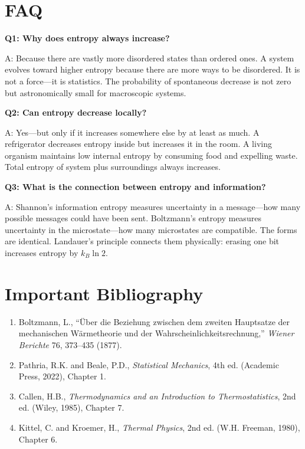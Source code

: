 \documentclass[11pt,openright]{book}
\begin{document}
\section*{FAQ}

\textbf{Q1: Why does entropy always increase?}

A: Because there are vastly more disordered states than ordered ones. A system evolves toward higher entropy because there are more ways to be disordered. It is not a force---it is statistics. The probability of spontaneous decrease is not zero but astronomically small for macroscopic systems.

\textbf{Q2: Can entropy decrease locally?}

A: Yes---but only if it increases somewhere else by at least as much. A refrigerator decreases entropy inside but increases it in the room. A living organism maintains low internal entropy by consuming food and expelling waste. Total entropy of system plus surroundings always increases.

\textbf{Q3: What is the connection between entropy and information?}

A: Shannon's information entropy measures uncertainty in a message---how many possible messages could have been sent. Boltzmann's entropy measures uncertainty in the microstate---how many microstates are compatible. The forms are identical. Landauer's principle connects them physically: erasing one bit increases entropy by $k_B \ln 2$.
\section*{Important Bibliography}

\begin{enumerate}
\item Boltzmann, L., ``\"Uber die Beziehung zwischen dem zweiten Hauptsatze der mechanischen W\"armetheorie und der Wahrscheinlichkeitsrechnung,'' \textit{Wiener Berichte} 76, 373--435 (1877).
\item Pathria, R.K. and Beale, P.D., \textit{Statistical Mechanics}, 4th ed. (Academic Press, 2022), Chapter 1.
\item Callen, H.B., \textit{Thermodynamics and an Introduction to Thermostatistics}, 2nd ed. (Wiley, 1985), Chapter 7.
\item Kittel, C. and Kroemer, H., \textit{Thermal Physics}, 2nd ed. (W.H. Freeman, 1980), Chapter 6.
\end{enumerate}
\end{document}
